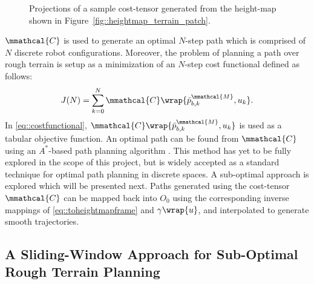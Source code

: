 				\begin{figure}
					\centering
					\caption{Projections of a sample cost-tensor generated from the height-map shown in Figure~\ref{fig::heightmap_terrain_patch}.}
					\label{fig::cost_map}
				\end{figure}

			$\mmathcal{C}$ is used to generate an optimal $N$-step path which is comprised of $N$ discrete robot configurations. Moreover, the problem of planning a path over rough terrain is setup as a minimization of an $N$-step cost functional defined as follows:
				\begin{equation}			
					J(N) = \sum_{k=0}^N \mmathcal{C}\wrap{\bar{p}^{\mmathcal{M}}_{b,k},u_{k}}.
					\label{eq::costfunctional}
				\end{equation}
			In \ref{eq::costfunctional}, $\mmathcal{C}\wrap{\bar{p}^{\mmathcal{M}}_{b,k},u_{k}}$ is used as a tabular objective function. An optimal path can be found from $\mmathcal{C}$ using an $A^{*}$-based path planning algorithm \cite{Hart1968}. This method has yet to be fully explored in the scope of this project, but is widely accepted as a standard technique for optimal path planning in discrete spaces. A sub-optimal approach is explored which will be presented next.  Paths generated using the cost-tensor $\mmathcal{C}$ can be mapped back into $O_{0}$ using the corresponding inverse mappings of \ref{eq::toheightmapframe} and $\gamma\wrap{u}$, and interpolated to generate smooth trajectories.
			






		\subsection{A Sliding-Window Approach for Sub-Optimal Rough Terrain Planning}

